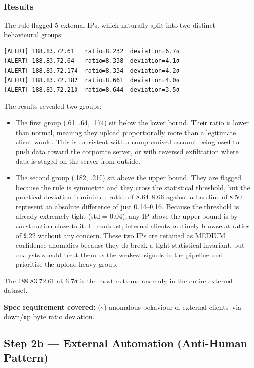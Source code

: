 \documentclass[
  11pt,
]{article}
\begin{document}
\subsubsection{Results}



The rule flagged 5 external IPs, which naturally split into two
distinct behavioural groups:

\begin{verbatim}
[ALERT] 188.83.72.61   ratio=8.232  deviation=6.7σ
[ALERT] 188.83.72.64   ratio=8.338  deviation=4.1σ
[ALERT] 188.83.72.174  ratio=8.334  deviation=4.2σ
[ALERT] 188.83.72.182  ratio=8.661  deviation=4.0σ
[ALERT] 188.83.72.210  ratio=8.644  deviation=3.5σ
\end{verbatim}

The results revealed two groups:
\begin{itemize}
  \item The first group (.61, .64, .174) sit below the lower bound. Their ratio is lower than normal, meaning they upload proportionally more than a legitimate client would. This is consistent with a compromised account being used to push data toward the corporate server, or with reversed exfiltration where data is staged on the server from outside.
  \item The second group (.182, .210) sit above the upper bound. They are flagged because the rule is symmetric and they cross the statistical threshold, but the practical deviation is minimal: ratios of 8.64--8.66 against a baseline of 8.50 represent an absolute difference of just 0.14--0.16. Because the threshold is already extremely tight (std = 0.04), any IP above the upper bound is by construction close to it. In contrast, internal clients routinely browse at ratios of 9.22 without any concern. These two IPs are retained as MEDIUM confidence anomalies because they do break a tight statistical invariant, but analysts should treat them as the weakest signals in the pipeline and prioritise the upload-heavy group.
\end{itemize}

The 188.83.72.61 at 6.7σ is the most extreme anomaly in the entire
external dataset.

\medskip
\noindent\colorbox{gray!12}{\parbox{\dimexpr\linewidth-2\fboxsep\relax}{\textbf{Spec requirement covered:} (v) anomalous behaviour of external clients, via down/up byte ratio deviation.}}

\hypertarget{external-automation}{%
\subsection{Step 2b — External Automation (Anti-Human Pattern)}\label{external-automation}}
\end{document}
